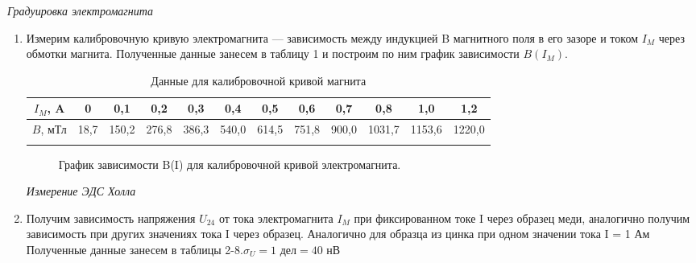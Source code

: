 \documentclass[a4paper, 12pt]{article}%
\begin{document}
	\textit{Градуировка электромагнита}
	\begin{enumerate}
		
	\item Измерим калибровочную кривую электромагнита — зависимость
	между индукцией B магнитного поля в его зазоре и током $I_M$ через обмотки магнита. Полученные данные занесем в таблицу 1 и построим по ним график зависимости $B(I_M)$. 
		
	\begin{longtable} {|c|c|c|c|c|c|c|c|c|c|c|c|}
		\hline
		$I_M$, A& 0 & 0,1 & 0,2 & 0,3 & 0,4 & 0,5 & 0,6 & 0,7 & 0,8 & 1,0 & 1,2  \\ \hline
		$B$, мТл & 18,7 & 150,2 & 276,8 & 386,3 & 540,0 & 614,5 & 751,8 & 900,0 & 1031,7 & 1153,6 & 1220,0 \\ \hline
		\caption{Данные для калибровочной кривой магнита}
	\end{longtable}
		
	\begin{figure}[H]
		\caption{График зависимости B(I) для калибровочной кривой электромагнита.}
	\end{figure}

	\textit{Измерение ЭДС Холла}\\
	
	\item Получим зависимость напряжения $U_{24}$ от тока электромагнита $I_M$ при фиксированном
	токе I через образец меди, аналогично получим зависимость при других значениях тока I через образец. Аналогично для образца из цинка при одном значении тока I = 1 Ам Полученные данные занесем в таблицы 2-8.$\sigma_U = 1 \text{ дел} = 40$ нВ
	

\end{enumerate}
\end{document}
